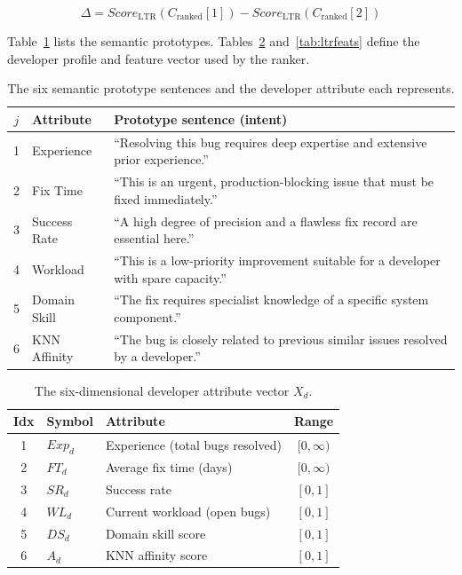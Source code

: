 \documentclass[sigconf,review,anonymous]{acmart}
\begin{document}
\begin{equation}
\Delta = \textit{Score}_{\text{LTR}}(C_{\text{ranked}}[1]) - \textit{Score}_{\text{LTR}}(C_{\text{ranked}}[2])
\end{equation}



Table~\ref{tab:protos} lists the semantic prototypes.
Tables~\ref{tab:devattr} and~\ref{tab:ltrfeats} define the developer profile
and feature vector used by the ranker.

\begin{table}[H]
\centering
\caption{The six semantic prototype sentences and the developer attribute
         each represents.}
\label{tab:protos}
\renewcommand{\arraystretch}{1.2}
\begin{tabular}{@{}clp{5.0cm}@{}}
\toprule
$j$ & \textbf{Attribute} & \textbf{Prototype sentence (intent)} \\
\midrule
1 & Experience   & ``Resolving this bug requires deep expertise and extensive prior experience.'' \\
2 & Fix Time     & ``This is an urgent, production-blocking issue that must be fixed immediately.'' \\
3 & Success Rate & ``A high degree of precision and a flawless fix record are essential here.'' \\
4 & Workload     & ``This is a low-priority improvement suitable for a developer with spare capacity.'' \\
5 & Domain Skill & ``The fix requires specialist knowledge of a specific system component.'' \\
6 & KNN Affinity & ``The bug is closely related to previous similar issues resolved by a developer.'' \\
\bottomrule
\end{tabular}
\end{table}

\begin{table}[H]
\centering
\caption{The six-dimensional developer attribute vector $X_d$.}
\label{tab:devattr}
\begin{tabular}{@{}cllc@{}}
\toprule
\textbf{Idx} & \textbf{Symbol}   & \textbf{Attribute}                 & \textbf{Range} \\
\midrule
1 & $\mathit{Exp}_d$ & Experience (total bugs resolved)     & $[0,\infty)$   \\
2 & $FT_d$           & Average fix time (days)              & $[0,\infty)$   \\
3 & $SR_d$           & Success rate                         & $[0,1]$        \\
4 & $WL_d$           & Current workload (open bugs)         & $[0,1]$        \\
5 & $DS_d$           & Domain skill score                   & $[0,1]$        \\
6 & $A_d$            & KNN affinity score                   & $[0,1]$        \\
\bottomrule
\end{tabular}
\end{table}
\end{document}
